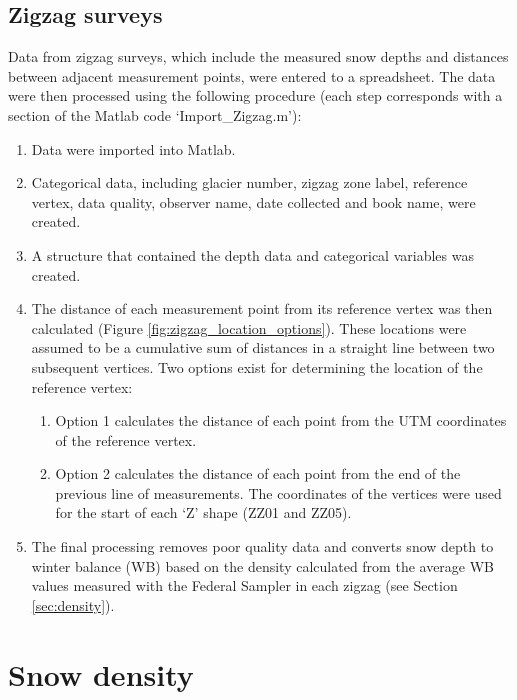 \documentclass{sfuthesis}
\begin{document}
{\begin{appendices}
\subsection{Zigzag surveys}

Data from zigzag surveys, which include the measured snow depths and distances between adjacent measurement points, were entered to a spreadsheet. The data were then processed using the following procedure (each step corresponds with a section of the Matlab code `Import\_Zigzag.m'):
\begin{enumerate}
\item Data were imported into Matlab.
\item Categorical data, including glacier number, zigzag zone label, reference vertex, data quality, observer name, date collected and book name, were created.
\item A structure that contained the depth data and categorical variables was created.
\item The distance of each measurement point from its reference vertex was then calculated (Figure \ref{fig:zigzag_location_options}). These locations were assumed to be a cumulative sum of distances in a straight line between two subsequent vertices. Two options exist for determining the location of the reference vertex:
 	\begin{enumerate}
	\item Option 1 calculates the distance of each point from the UTM coordinates of the reference vertex.
	\item Option 2 calculates the distance of each point from the end of the previous line of measurements. The coordinates of the vertices were used for the start of each `Z' shape (ZZ01 and ZZ05).
	\end{enumerate}
\item The final processing removes poor quality data and converts snow depth to winter balance (WB) based on the density calculated from the average WB values measured with the Federal Sampler in each zigzag (see Section \ref{sec:density}).
\end{enumerate}

\section{Snow density}


\end{appendices}}
\end{document}

